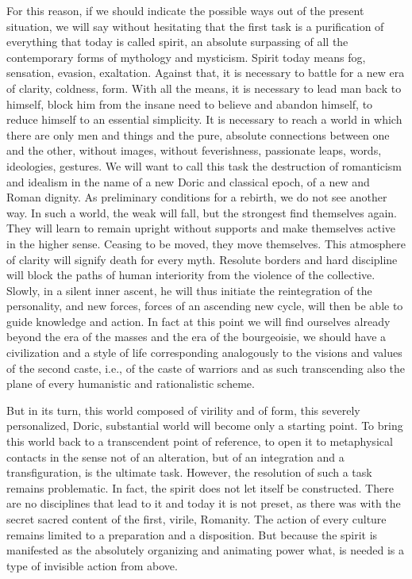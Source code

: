 For this reason, if we should indicate the possible ways out of the present situation, we will say without hesitating that the first task is a purification of everything that today is called spirit, an absolute surpassing of all the contemporary forms of mythology and mysticism. Spirit today means fog, sensation, evasion, exaltation. Against that, it is necessary to battle for a new era of clarity, coldness, form. With all the means, it is necessary to lead man back to himself, block him from the insane need to believe and abandon himself, to reduce himself to an essential simplicity. It is necessary to reach a world in which there are only men and things and the pure, absolute connections between one and the other, without images, without feverishness, passionate leaps, words, ideologies, gestures. We will want to call this task the destruction of romanticism and idealism in the name of a new Doric and classical epoch, of a new and Roman dignity. As preliminary conditions for a rebirth, we do not see another way. In such a world, the weak will fall, but the strongest find themselves again. They will learn to remain upright without supports and make themselves active in the higher sense. Ceasing to be moved, they move themselves. This atmosphere of clarity will signify death for every myth. Resolute borders and hard discipline will block the paths of human interiority from the violence of the collective. Slowly, in a silent inner ascent, he will thus initiate the reintegration of the personality, and new forces, forces of an ascending new cycle, will then be able to guide knowledge and action. In fact at this point we will find ourselves already beyond the era of the masses and the era of the bourgeoisie, we should have a civilization and a style of life corresponding analogously to the visions and values of the second caste, i.e., of the caste of warriors and as such transcending also the plane of every humanistic and rationalistic scheme.

But in its turn, this world composed of virility and of form, this severely personalized, Doric, substantial world will become only a starting point. To bring this world back to a transcendent point of reference, to open it to metaphysical contacts in the sense not of an alteration, but of an integration and a transfiguration, is the ultimate task. However, the resolution of such a task remains problematic. In fact, the spirit does not let itself be constructed. There are no disciplines that lead to it and today it is not preset, as there was with the secret sacred content of the first, virile, Romanity. The action of every culture remains limited to a preparation and a disposition. But because the spirit is manifested as the absolutely organizing and animating power what, is needed is a type of invisible action from above.


